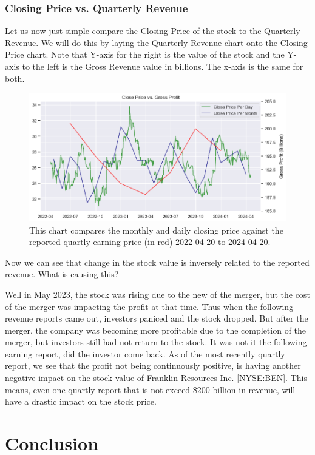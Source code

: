 \documentclass[9pt,a4paper,twoside]{tau}
\begin{document}
    \subsubsection{Closing Price vs. Quarterly Revenue}   
        Let us now just simple compare the Closing Price of the stock to the Quarterly Revenue. We will do this by laying the Quarterly Revenue chart onto the Closing Price chart. Note that Y-axis for the right is the value of the stock and the Y-axis to the left is the Gross Revenue value in billions. The x-axis is the same for both.  
            \begin{figure}[H]
                \centering
                \includegraphics[width=0.85\columnwidth]{images/CloseDataVsProfit.png}
                \caption{This chart compares the monthly and daily closing price against the reported quartly earning price (in red) 2022-04-20 to 2024-04-20.}
                \label{fig:figure}
            \end{figure}
        Now we can see that change in the stock value is inversely related to the reported revenue. What is causing this?

        Well in May 2023, the stock was rising due to the new of the merger, but the cost of the merger was impacting the profit at that time. Thus when the following revenue reports came out, investors paniced and the stock dropped. But after the merger, the company was becoming more profitable due to the completion of the merger, but investors still had not return to the stock. 
        It was not it the following earning report, did the investor come back. 
        As of the most recently quartly report, we see that the profit not being continuously positive, is having another negative impact on the stock value of Franklin Resources Inc. [NYSE:BEN]. This means, even one quartly report that is not exceed \$200 billion in revenue, will have a drastic impact on the stock price. 



\section{Conclusion}
\end{document}
